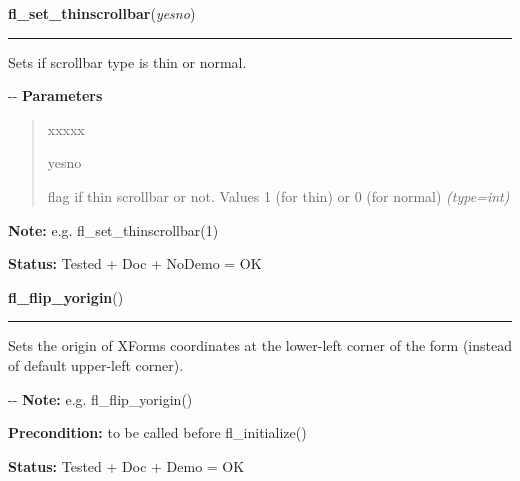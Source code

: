 \hspace{.8\funcindent}\begin{boxedminipage}{\funcwidth}

    \raggedright \textbf{fl\_set\_thinscrollbar}(\textit{yesno})

    \vspace{-1.5ex}

    \rule{\textwidth}{0.5\fboxrule}
\setlength{\parskip}{2ex}

Sets if scrollbar type is thin or normal.

-{}-
\setlength{\parskip}{1ex}
      \textbf{Parameters}
      \vspace{-1ex}

      \begin{quote}
        \begin{Ventry}{xxxxx}

          \item[yesno]


flag if thin scrollbar or not. Values 1 (for thin) or 0 (for normal)
            {\it (type=int)}

        \end{Ventry}

      \end{quote}

\textbf{Note:} 
e.g. fl\_set\_thinscrollbar(1)


\textbf{Status:} 
Tested + Doc + NoDemo = OK


    \end{boxedminipage}

    \label{xformslib:flbasic:fl_flip_yorigin}

    \vspace{0.5ex}

\hspace{.8\funcindent}\begin{boxedminipage}{\funcwidth}

    \raggedright \textbf{fl\_flip\_yorigin}()

    \vspace{-1.5ex}

    \rule{\textwidth}{0.5\fboxrule}
\setlength{\parskip}{2ex}

Sets the origin of XForms coordinates at the lower-left corner of the
form (instead of default upper-left corner).

-{}-
\setlength{\parskip}{1ex}
\textbf{Note:} 
e.g. fl\_flip\_yorigin()


\textbf{Precondition:} 
to be called before fl\_initialize()


\textbf{Status:} 
Tested + Doc + Demo = OK


    \end{boxedminipage}


